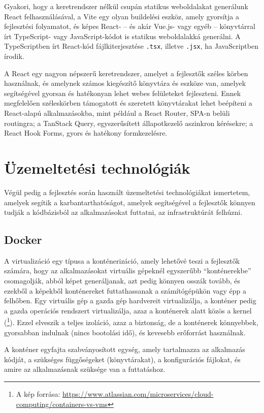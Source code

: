 Gyakori, hogy a keretrendszer nélkül csupán statikus weboldalakat generálunk React felhasználásával, a Vite egy olyan buildelési eszköz, amely gyorsítja a fejlesztési folyamatot, és képes React- -- és akár Vue.js- vagy egyéb -- könyvtárral írt TypeScript- vagy JavaScript-kódot is statikus weboldalakká generálni. A TypeScriptben írt React-kód fájlkiterjesztése \verb|.tsx|, illetve \verb|.jsx|, ha JavaScriptben írodik.

A React egy nagyon népszerű keretrendszer, amelyet a fejlesztők széles körben használnak, és amelynek számos kiegészítő könyvtára és eszköze van, amelyek segítségével gyorsan és hatékonyan lehet webes felületeket fejleszteni. Ennek megfelelően széleskörben támogatott és szeretett könyvtárakat lehet beépíteni a React-alapú alkalmazásokba, mint például a React Router, SPA-n belüli routingra; a TanStack Query, egyszerűsített állapotkezelő aszinkron kérésekre; a React Hook Forms, gyors és hatékony formkezelésre.

\section{Üzemeltetési technológiák}

Végül pedig a fejlesztés során használt üzemeltetési technológiákat ismertetem, amelyek segítik a karbantarthatóságot, amelyek segítségével a fejlesztők könnyen tudják a kódbázisból az alkalmazásokat futtatni, az infrastruktúrát felhúzni.

\subsection{Docker}

A virtualizáció egy típusa a konténerizáció, amely lehetővé teszi a fejlesztők számára, hogy az alkalmazásokat virtuális gépeknél egyszerűbb ``konténerekbe'' csomagolják, abból képet generáljanak, azt pedig könnyen osszák tovább, és ezekből a képekből konténereket futtathassanak a számítógépükön vagy épp a felhőben. Egy virtuális gép a gazda gép hardvereit virtualizálja, a konténer pedig a gazda operációs rendszert virtualizálja, azaz a konténerek alatt közös a kernel (\footnote{A kép forrása: \url{https://www.atlassian.com/microservices/cloud-computing/containers-vs-vms}}). Ezzel elveszik a teljes izoláció, azaz a biztonság, de a konténerek könnyebbek, gyorsabban indulnak (nincs bootolási idő), és kevesebb erőforrást használnak. 

A konténer egyfajta szabványosított egység, amely tartalmazza az alkalmazás kódját, a szükséges függőségeket (könyvtárakat), a konfigurációs fájlokat, és amire az alkalmazásnak szüksége van a futtatáshoz.

